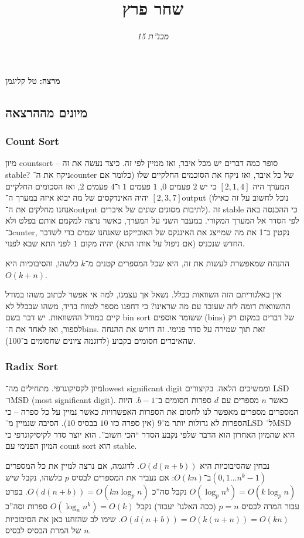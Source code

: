 \documentclass[]{article}
\author{\textit{מבנ''ת 15}}
\title{שחר פרץ}
\newcommand\en[1] {\begin{otherlanguage}{english}#1\end{otherlanguage}}
\theoremstyle{definition}
\begin{document}
    \maketitle
    \textbf{מרצה: }טל קליגמן
    
    \subsection*{מיונים מההרצאה}
    \en{\subsubsection*{Count Sort}}
    מיון countsort – סופר כמה דברים יש מכל איבר, ואז ממיין לפי זה. כיצד נעשה את זה stable? ניקח את ה־counter של כל איבר, ואז ניקח את הסוכמים החלקיים שלו (כלומר אם המערך היה $[2, 1, 4]$ כי יש $2$ פעמים $0$, $1$ פעמים $1$ ו־$4$ פעמים $2$, ואז הסכומים החלקיים $[2, 3, 7]$ יהיה האינדקסים של מה יבוא איזה במערך ה־output (נוכל לחשוב על זה כאילו אנחנו מחלקים את ה־output לתיבות מסוגים שונים של איברים). זה stable כי ההכנסה באה לפי הסדר אל המערך המקורי. במעבר השני על המערך, כאשר נרצה למקמם אותם בפלט ולא ב־cunter, נקטין ב־1 את מה שמייצג את האינגקס של האובייקט שאנחנו שמים כדי לשדבר החדש שנכניס (אם ניפול על אותו התא) יהיה מקום $1$ לפני התא שבא לפנוי. 
    
    ההנהח שמאפשרת לעשות את זה, היא שכל המספרים קטנים מ־$k$ כלשהו, והסיבוכיות היא $O(k+n)$.
    
    אין באלגוריתם הזה השוואות בכלל. נשאל אך עצמנו, למה אי אפשר לכתוב משהו במודל ההשוואות דומה לזה שעובד עם מה שראינו? כי דחפנו מספר לטווח בדיד, משהו שבכלל לא קיים במודל ההשוואות. 
    יש דבר בשם bin sort ששומר אוספים (bins) של דברים במקום רק לספור, ואז לאחד את ה־bins. זאת תוך שמירה על סדר פנימי. זה דורש את ההנחה שהאיברים חסומים בקבוע (לדוגמה ציונים שחסומים ב־100). 
    
    \en{\subsubsection*{Radix Sort}}
    מיון לקסיקוגרפי. מתחילים מה־lowest significant digit וממשיכים הלאה. בקיצורים LSD ו־MSD (most significant digit). כאשר $n$ מספרים עם $d$ ספרות חסומים ב־$b - 1$. היות המספרים מספרים מאפשר לנו לחסום את הספרות האפשרויות כאשר נמיין על כל ספרה – כי הספרות לא גדולות יותר מ־$9$ (אין ספרה כזו $10$ בבסיס $10$). הסיבה שנמיין מ־LSD ל־MSD היא שהמיון האחרון הוא הדבר שלפי נקבע הסדר ``הכי חשוב''. הוא יוצר סדר לקיסיקוגרפי כי המיון הפנימי עם count sort הוא stable. 
    
    נבחין שהסיבוכיות היא $O(d(n + b))$. לדוגמה, אם נרצה למיין את כל המספרים $(0, 1 \dots n^{k} - 1)$ב־$O(kn)$: אם נעביר את המספרים לבסיס $p$ כלשהו, נקבל שיש $O(\log_pn^{k}) = O(k \log_p n)$ נקבל סה''כ $O(d(n + b)) = O(k n \log_p n)$. בפרט עבור המרה לבסיס $p = n$ (ככה האלגו' יעבוד) נקבל $O(\log_n n^k) = O(k)$ ספרות וסה''כ $O(d(n + b)) = O(k(n + n)) =  O(kn)$. שימו לב שהזחנו כאן את הסיבוכיות של המרת הבסיס לבסיס $n$. 
    
\end{document}
